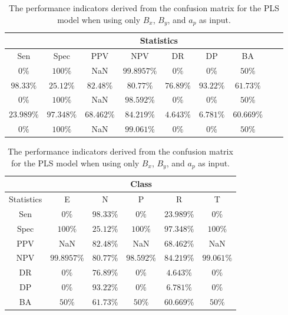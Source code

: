 \begin{table}[!ht]
	\centering
	\begin{tabular}{|c|c|c|c|c|c|c|c|c|}
		\hline
		 & \multicolumn{7}{c|}{Statistics} \\ \hline
		Sen & Spec & PPV & NPV & DR & DP & BA \\ \hline
		$0\%$ & $100\%$ & NaN & $99.8957\%$ & $0\%$ & $0\%$ & $50\%$ \\ \hline
		$98.33\%$ & $25.12\%$ & $82.48\%$ & $80.77\%$ & $76.89\%$ & $93.22\%$ & $61.73\%$ \\ \hline
		$0\%$ & $100\%$ & NaN & $98.592\%$ & $0\%$ & $0\%$ & $50\%$ \\ \hline
		$23.989\%$ & $97.348\%$ & $68.462\%$ & $84.219\%$ & $4.643\%$ & $6.781\%$ & $60.669\%$ \\ \hline
		$0\%$ & $100\%$ & NaN & $99.061\%$ & $0\%$ & $0\%$ & $50\%$ \\ \hline
	\end{tabular}
	\caption{The performance indicators derived from the confusion matrix for the PLS model when using only $B_{x}$, $B_{y}$, and $a_{p}$ as input.}
	\label{tab:cs:xyap:pls}
\end{table}

\begin{table}[!ht]
	\centering
	\begin{tabular}{|c|c|c|c|c|c|}
		\hline
		 & \multicolumn{5}{c|}{Class} \\ \hline
		Statistics & E & N & P & R & T \\ \hline
		Sen & $0\%$ & $98.33\%$ & $0\%$ & $23.989\%$ & $0\%$ \\ \hline
		Spec & $100\%$ & $25.12\%$ & $100\%$ & $97.348\%$ & $100\%$ \\ \hline
		PPV & NaN & $82.48\%$ & NaN & $68.462\%$ & NaN \\ \hline
		NPV & $99.8957\%$ & $80.77\%$ & $98.592\%$ & $84.219\%$ & $99.061\%$ \\ \hline
		DR & $0\%$ & $76.89\%$ & $0\%$ & $4.643\%$ & $0\%$ \\ \hline
		DP & $0\%$ & $93.22\%$ & $0\%$ & $6.781\%$ & $0\%$ \\ \hline
		BA & $50\%$ & $61.73\%$ & $50\%$ & $60.669\%$ & $50\%$ \\ \hline
	\end{tabular}
	\caption{The performance indicators derived from the confusion matrix for the PLS model when using only $B_{x}$, $B_{y}$, and $a_{p}$ as input.}
	\label{tab:cs:reverse:xyap:pls}
\end{table}

